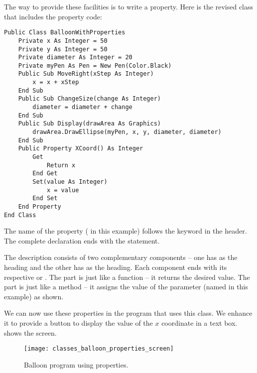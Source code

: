 		The way to provide these facilities is to write a property. Here is the revised class that includes the property code:
		\begin{lstlisting}
Public Class BalloonWithProperties
	Private x As Integer = 50
	Private y As Integer = 50
	Private diameter As Integer = 20
	Private myPen As Pen = New Pen(Color.Black)
	Public Sub MoveRight(xStep As Integer)
		x = x + xStep
	End Sub
	Public Sub ChangeSize(change As Integer)
		diameter = diameter + change
	End Sub
	Public Sub Display(drawArea As Graphics)
		drawArea.DrawEllipse(myPen, x, y, diameter, diameter)
	End Sub
	Public Property XCoord() As Integer
		Get
			Return x
		End Get
		Set(value As Integer)
			x = value
		End Set
	End Property
End Class
		\end{lstlisting}
		The name of the property ( in this example) follows the keyword  in the header. The complete declaration ends with the  statement.
		
		The description consists of two complementary components – one has  as the heading and the other has  as the heading. Each component ends with its respective  or . The  part is just like a function – it returns the desired value. The  part is just like a method – it assigns the value of the parameter (named  in this example) as shown.
		
		We can now use these properties in the program that uses this class. We enhance it to provide a button to display the value of the $x$ coordinate in a text box.  shows the screen.
		
		\begin{figure}[bth]
			\centering
			\texttt{[image: classes\_balloon\_properties\_screen]}
			\caption{Balloon program using properties.}
			\label{fig:classes_balloon_properties_screen}
		\end{figure}


